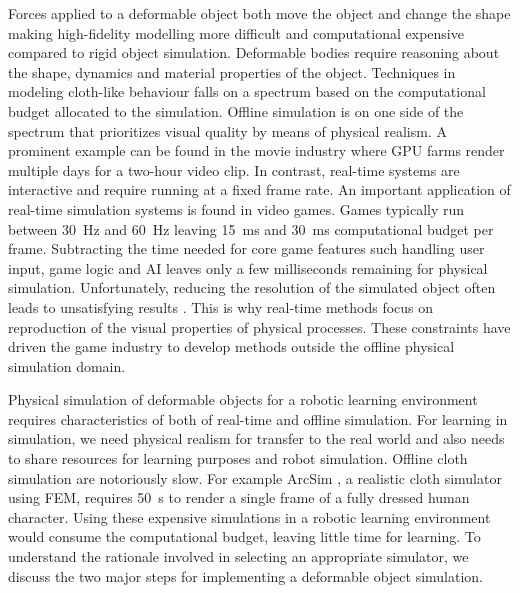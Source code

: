 \documentclass[\home/main.tex]{subfiles}
\begin{document}
Forces applied to a deformable object both move the object and change the shape making high-fidelity modelling more difficult and computational expensive compared to rigid object simulation. Deformable bodies require reasoning about the shape, dynamics and material properties of the object. Techniques in modeling cloth-like behaviour falls on a spectrum based on the computational budget allocated to the simulation. Offline simulation is on one side of the spectrum that prioritizes visual quality by means of physical realism. A prominent example can be found in the movie industry where \gls{GPU} farms render multiple days for a two-hour video clip. In contrast, real-time systems are interactive and require running at a fixed frame rate. An important application of real-time simulation systems is found in video games. Games typically run between \SI{30}{\hertz} and \SI{60}{\hertz} leaving \SI{15}{\milli\second} and \SI{30}{\milli\second} computational budget per frame. Subtracting the time needed for core game features such handling user input, game logic and \gls{AI} leaves only a few milliseconds remaining for physical simulation. Unfortunately, reducing the resolution of the simulated object often leads to unsatisfying results \autocite{muller2008real}. This is why real-time methods focus on reproduction of the visual properties of physical processes. These constraints have driven the game industry to develop methods outside the offline physical simulation domain.

Physical simulation of deformable objects for a robotic learning environment requires characteristics of both of real-time and offline simulation. For learning in simulation, we need physical realism for transfer to the real world and also needs to share resources for learning purposes and robot simulation. Offline cloth simulation are notoriously slow. For example ArcSim \autocite{narain2012adaptive}, a realistic cloth simulator using \gls{FEM}, requires \SI{50}{\second} to render a single frame of a fully dressed human character. Using these expensive simulations in a robotic learning environment would consume the computational budget, leaving little time for learning. To understand the rationale involved in selecting an appropriate simulator, we discuss the two major steps for implementing a deformable object simulation.
\end{document}
